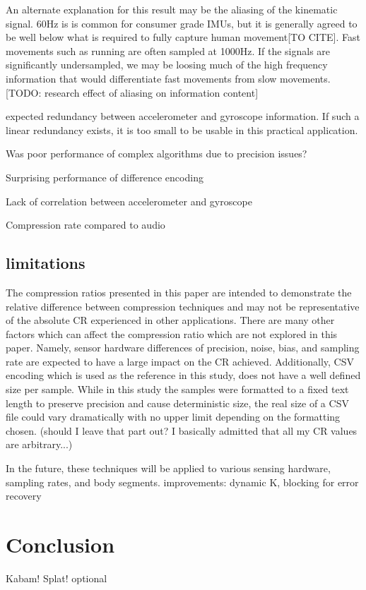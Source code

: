 \documentclass[journal]{IEEEtran}
\begin{document}
An alternate explanation for this result may be the aliasing of the kinematic signal. 60Hz is is common for consumer grade IMUs, but it is generally agreed to be well below what is required to fully capture human movement[TO CITE]. Fast movements such as running are often sampled at 1000Hz. If the signals are significantly undersampled, we may be loosing much of the high frequency information that would differentiate fast movements from slow movements. [TODO: research effect of aliasing on information content]

expected redundancy between accelerometer and gyroscope information. If such a linear redundancy exists, it is too small to be usable in this practical application.

Was poor performance of complex algorithms due to precision issues?

Surprising performance of difference encoding

Lack of correlation between accelerometer and gyroscope

Compression rate compared to audio

\subsection{limitations}

The compression ratios presented in this paper are intended to demonstrate the relative difference between compression techniques and may not be representative of the absolute CR experienced in other applications. There are many other factors which can affect the compression ratio which are not explored in this paper. Namely, sensor hardware differences of precision, noise, bias, and sampling rate are expected to have a large impact on the CR achieved. Additionally, CSV encoding which is used as the reference in this study, does not have a well defined size per sample. While in this study the samples were formatted to a fixed text length to preserve precision and cause deterministic size, the real size of a CSV file could vary dramatically with no upper limit depending on the formatting chosen. (should I leave that part out? I basically admitted that all my CR values are arbitrary...)

In the future, these techniques will be applied to various sensing hardware, sampling rates, and body segments.
improvements: dynamic K, blocking for error recovery

\section{Conclusion}
Kabam! Splat!
optional
\end{document}
